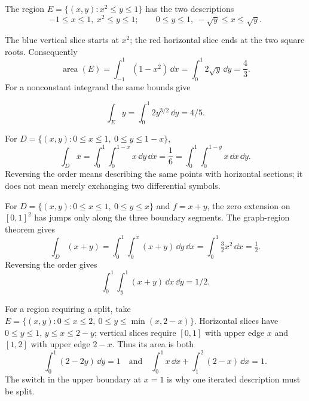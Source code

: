 \begin{example}\label{ex:parabolic-slices}
The region $E=\{(x,y):x^2\leq y\leq1\}$ has the two descriptions
\[
-1\leq x\leq1,\ x^2\leq y\leq1;
\qquad 0\leq y\leq1,\ -\sqrt y\leq x\leq\sqrt y.
\]
\noindent\begin{minipage}{\linewidth}
\begin{center}
\end{center}
The blue vertical slice starts at $x^2$; the red horizontal slice ends at
the two square roots. Consequently
\[
\operatorname{area}(E)=\int_{-1}^1(1-x^2)\,\dd x
=\int_0^1 2\sqrt y\,\dd y=\frac43.
\]
For a nonconstant integrand the same bounds give

\[
\int_E y=\int_0^1 2y^{3/2}\,\dd y=4/5.
\]

\end{minipage}
\end{example}

\begin{example}
For $D=\{(x,y):0\leq x\leq1,\ 0\leq y\leq1-x\}$,
\[
\int_D x=\int_0^1\int_0^{1-x}x\,\dd y\,\dd x=\frac16
=\int_0^1\int_0^{1-y}x\,\dd x\,\dd y.
\]
Reversing the order means describing the same points with horizontal
sections; it does not mean merely exchanging two differential symbols.
\end{example}

\begin{example}
For $D=\{(x,y):0\leq x\leq1,\ 0\leq y\leq x\}$ and $f=x+y$,
the zero extension on $[0,1]^2$ has jumps only along the three boundary
segments. The graph-region theorem gives
\[
\int_D(x+y)=\int_0^1\int_0^x(x+y)\,\dd y\,\dd x
=\int_0^1\tfrac32x^2\,\dd x=\tfrac12.
\]
Reversing the order gives
\[
\int_0^1\int_y^1(x+y)\,\dd x\,\dd y=1/2.
\]

For a region requiring a split, take
$E=\{(x,y):0\leq x\leq2,\ 0\leq y\leq\min(x,2-x)\}$.
Horizontal slices have $0\leq y\leq1$, $y\leq x\leq2-y$;
vertical slices require $[0,1]$ with upper edge $x$ and $[1,2]$
with upper edge $2-x$. Thus its area is both
\[
\int_0^1(2-2y)\,\dd y=1
\quad\text{and}\quad
\int_0^1x\,\dd x+\int_1^2(2-x)\,\dd x=1.
\]
The switch in the upper boundary at $x=1$ is why one iterated description
must be split.
\end{example}

